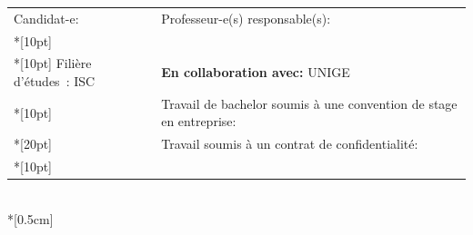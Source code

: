 \begin{spacing}{0.96}
	\vfill

	\begin{center}
		{\sf
			\begin{tabular*}{16cm}{p{7.58cm} p{7.58cm}}
				\small Candidat-e:					&	\small Professeur-e(s) responsable(s):\\*[10pt]
				\small\textbf{\textsc{\Author}}		&	\small\textbf{\textsc{\Professor}}\\*[10pt]
				\footnotesize  Filière d’études : ISC	&	\footnotesize  \textbf{En collaboration avec:} UNIGE\\*[10pt]
				\footnotesize  {} & \footnotesize  Travail de bachelor soumis à une convention de stage en entreprise: \Convention\\*[20pt]
				\footnotesize  {} & \footnotesize  Travail soumis à un contrat de confidentialité: \Confidentiel\\*[10pt]
			\end{tabular*}\\*[0.5cm]
		}
	\end{center}
\end{spacing}